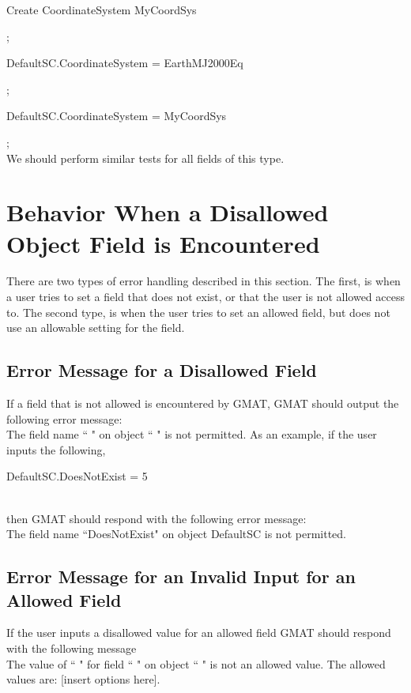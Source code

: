 \documentclass[10 pt]{book}
\newcommand{\st}[1]{\begin{ttfamily}#1\end{ttfamily}}
\begin{document}
\noindent \st{Create CoordinateSystem MyCoordSys};\\
\st{DefaultSC.CoordinateSystem = EarthMJ2000Eq};\\
\st{DefaultSC.CoordinateSystem = MyCoordSys};\\

We should perform similar tests for all fields of this type.

\section{Behavior When a Disallowed Object Field is Encountered }
\label{Sec:ErrorHandling}

There are two types of error handling described in this section. The
first, is when a user tries to set a field that does not exist, or
that the user is not allowed access to.  The second type, is when
the user tries to set an allowed field, but does not use an
allowable setting for the field.

\subsection{Error Message for a Disallowed Field}

If a field that is not allowed is encountered by GMAT, GMAT should
output the following error message: \\

\noindent The field name `` " on object `` " is not permitted. As an
example, if the user inputs the
following, \\

\noindent \st{DefaultSC.DoesNotExist = 5}\\

\noindent then GMAT should respond with the following error
message:\\

\noindent  The field name ``DoesNotExist" on object DefaultSC is not
permitted.

\subsection{Error Message for an Invalid Input for an Allowed Field}

If the user inputs a disallowed value for an allowed field GMAT
should respond with the following message\\

\noindent The value of `` " for field `` " on object `` " is not an
allowed value.  The allowed values are: [insert options here].\\
\end{document}
